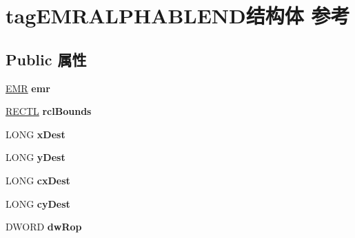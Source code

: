 \hypertarget{structtag_e_m_r_a_l_p_h_a_b_l_e_n_d}{}\section{tag\+E\+M\+R\+A\+L\+P\+H\+A\+B\+L\+E\+N\+D结构体 参考}
\label{structtag_e_m_r_a_l_p_h_a_b_l_e_n_d}
\subsection*{Public 属性}
\begin{DoxyCompactItemize}
\item 
\mbox{\label{structtag_e_m_r_a_l_p_h_a_b_l_e_n_d_a9bc7d4acb73773be2d49aeb50da5476a}} 
\hyperlink{structtag_e_m_r}{E\+MR} {\bfseries emr}
\item 
\mbox{\label{structtag_e_m_r_a_l_p_h_a_b_l_e_n_d_ada15303dcf5803a6021055724dd88044}} 
\hyperlink{struct___r_e_c_t_l}{R\+E\+C\+TL} {\bfseries rcl\+Bounds}
\item 
\mbox{\label{structtag_e_m_r_a_l_p_h_a_b_l_e_n_d_ac303b6e8befb2361dcbf102addd8d2fb}} 
L\+O\+NG {\bfseries x\+Dest}
\item 
\mbox{\label{structtag_e_m_r_a_l_p_h_a_b_l_e_n_d_a5513ac04d25e9f67928c740ca24c730a}} 
L\+O\+NG {\bfseries y\+Dest}
\item 
\mbox{\label{structtag_e_m_r_a_l_p_h_a_b_l_e_n_d_a51e66227ef0b6406c1bc1511e5e840a4}} 
L\+O\+NG {\bfseries cx\+Dest}
\item 
\mbox{\label{structtag_e_m_r_a_l_p_h_a_b_l_e_n_d_a345797e7b0e28ad5d95de7737ea0c842}} 
L\+O\+NG {\bfseries cy\+Dest}
\item 
\mbox{\label{structtag_e_m_r_a_l_p_h_a_b_l_e_n_d_a3d79de84e39ef9ab5d2a7b0cdaecb991}} 
D\+W\+O\+RD {\bfseries dw\+Rop}
\item 
\mbox{\label{structtag_e_m_r_a_l_p_h_a_b_l_e_n_d_a53270e0d7d1eb5a44903b0b57a9c0471}} 

\end{DoxyCompactItemize}
